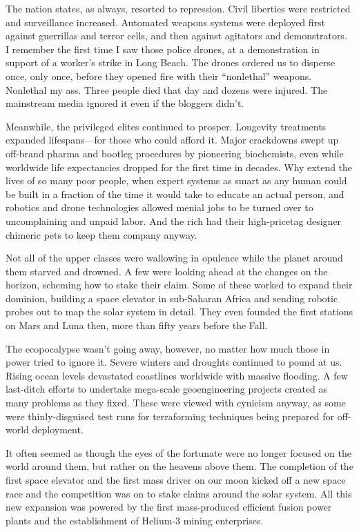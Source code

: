 The nation states, as always, resorted to repression. Civil liberties were restricted and surveillance 
increased. Automated weapons systems were deployed first against guerrillas and terror cells, and 
then against agitators and demonstrators. I remember the first time I saw those police drones, at a 
demonstration in support of a worker's strike in Long 
Beach. The drones ordered us to disperse once, only 
once, before they opened fire with their ``nonlethal'' 
weapons. Nonlethal my ass. Three people died that 
day and dozens were injured. The mainstream media 
ignored it even if the bloggers didn't.

Meanwhile, the privileged elites continued to prosper. Longevity treatments expanded lifespans—for 
those who could afford it. Major crackdowns swept 
up off-brand pharma and bootleg procedures by 
pioneering biochemists, even while worldwide life expectancies dropped for the first time in decades. Why 
extend the lives of so many poor people, when expert 
systems as smart as any human could be built in a 
fraction of the time it would take to educate an actual 
person, and robotics and drone technologies allowed 
menial jobs to be turned over to uncomplaining and 
unpaid labor. And the rich had their high-pricetag 
designer chimeric pets to keep them company anyway.

Not all of the upper classes were wallowing in 
opulence while the planet around them starved and 
drowned. A few were looking ahead at the changes on 
the horizon, scheming how to stake their claim. Some 
of these worked to expand their dominion, building 
a space elevator in sub-Saharan Africa and sending 
robotic probes out to map the solar system in detail. 
They even founded the first stations on Mars and 
Luna then, more than fifty years before the Fall.

The ecopocalypse wasn't going away, however, no 
matter how much those in power tried to ignore it. 
Severe winters and droughts continued to pound at us. 
Rising ocean levels devastated coastlines worldwide 
with massive flooding. A few last-ditch efforts to undertake mega-scale geoengineering projects created as 
many problems as they fixed. These were viewed with 
cynicism anyway, as some were thinly-disguised test 
runs for terraforming techniques being prepared for 
off-world deployment.

It often seemed as though the eyes of the fortunate 
were no longer focused on the world around them, 
but rather on the heavens above them. The completion of the first space elevator and the first mass driver 
on our moon kicked off a new space race and the 
competition was on to stake claims around the solar 
system. All this new expansion was powered by the 
first mass-produced efficient fusion power plants and 
the establishment of Helium-3 mining enterprises.

